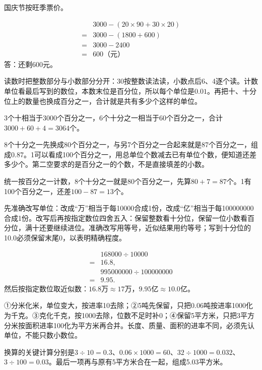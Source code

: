 \documentclass[multi=snippet,border=0pt]{standalone}
\newenvironment{snippet}[3]{\begin{minipage}{#1bp}\color{answerred}\fontsize{#2}{#3}\selectfont\raggedright}{\end{minipage}}
\begin{document}
\begin{snippet}{264}{10.5}{12.8}国庆节按旺季票价。\par \[\begin{aligned}&3000-(20\times90+30\times20)\\={}&3000-(1800+600)\\={}&3000-2400\\={}&600\text{（元）}\end{aligned}\]答：还剩600元。\end{snippet}
\begin{snippet}{505}{11.5}{14}读数时把整数部分与小数部分分开：30按整数读法读，小数点后6、4逐个读。计数单位看最后写到的数位，本数末位是百分位，所以每个单位是\(0.01\)。再把十、十分位上的数量也换成百分之一，合计就是共有多少个这样的单位。\par 3个十相当于3000个百分之一，6个十分之一相当于60个百分之一，合计\(3000+60+4=3064\)个。\end{snippet}
\begin{snippet}{505}{11.5}{14}8个十分之一先换成80个百分之一，与另7个百分之一合起来就是87个百分之一，组成0.87。1可以看成100个百分之一，用总单位个数减去已有单位个数，便知道还差多少个。第二空要求的是百分之一的个数，不是直接填差的小数。\par 统一按百分之一计数，8个十分之一就是80个百分之一，先算\(80+7=87\)个。1有100个百分之一，还差\(100-87=13\)个。\end{snippet}
\begin{snippet}{505}{11.5}{14}先准确改写单位：改成“万”相当于每10000合成1份，改成“亿”相当于每100000000合成1份。改写后再按指定数位四舍五入：保留整数看十分位，保留一位小数看百分位，满十还要继续进位。准确改写用等号，近似结果用约等号；写到十分位的10.0必须保留末尾0，以表明精确程度。\par \[\begin{aligned}&168000\div10000\\={}&16.8,\\&995000000\div100000000\\={}&9.95.\end{aligned}\]然后按指定数位取近似数：\(16.8\text{万}\approx17\text{万}\)，\(9.95\text{亿}\approx10.0\text{亿}\)。\end{snippet}
\begin{snippet}{505}{11.5}{14}①分米化米，单位变大，按进率10去除；②5吨先保留，只把0.06吨按进率1000化为千克。③克化千克，按1000去除，位数不足时补0；④保留5平方米，只把3平方分米按面积进率100化为平方米再合并。长度、质量、面积的进率不同，必须先认单位，不能只数小数位。\par 换算的关键计算分别是\(3\div10=0.3\)、\(0.06\times1000=60\)、\(32\div1000=0.032\)、\(3\div100=0.03\)。最后一项再与原有5平方米合在一起，组成5.03平方米。\end{snippet}
\end{document}
